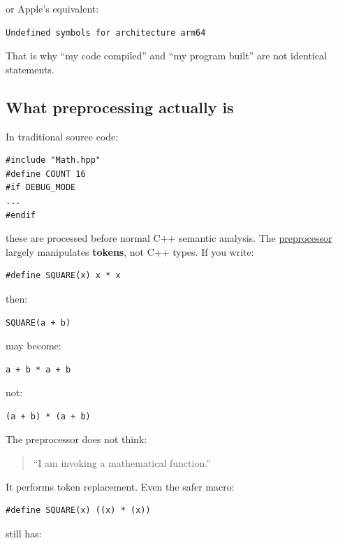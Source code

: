 or Apple's equivalent:

\begin{verbatim}
Undefined symbols for architecture arm64
\end{verbatim}

That is why ``my code compiled'' and ``my program built'' are not identical statements.

\subsection{What preprocessing actually is}\label{05-engine-i-ch002-what-preprocessing-actually-is}

In traditional source code:

\begin{verbatim}
#include "Math.hpp"
#define COUNT 16
#if DEBUG_MODE
...
#endif
\end{verbatim}

these are processed before normal C++ semantic analysis. The \hyperref[appendix-33c0a92ce855]{preprocessor} largely manipulates \textbf{tokens}, not C++ types. If you write:

\begin{verbatim}
#define SQUARE(x) x * x
\end{verbatim}

then:

\begin{verbatim}
SQUARE(a + b)
\end{verbatim}

may become:

\begin{verbatim}
a + b * a + b
\end{verbatim}

not:

\begin{verbatim}
(a + b) * (a + b)
\end{verbatim}

The preprocessor does not think:

\begin{quote}
``I am invoking a mathematical function.''
\end{quote}

It performs token replacement. Even the safer macro:

\begin{verbatim}
#define SQUARE(x) ((x) * (x))
\end{verbatim}

still has:

